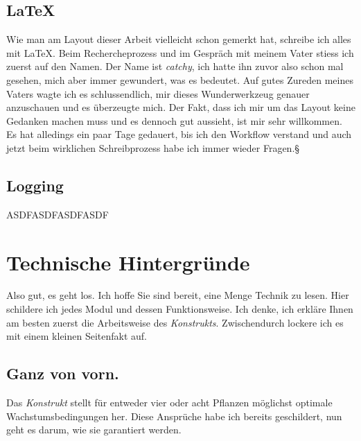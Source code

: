 \documentclass[12pt,titlepage,a4paper]{article}
\begin{document}
\subsection{LaTeX}
Wie man am Layout dieser Arbeit vielleicht schon gemerkt hat, schreibe ich alles mit LaTeX. Beim Rechercheprozess und im Gespräch mit meinem Vater stiess ich zuerst auf den Namen. Der Name ist \textit{catchy}, ich hatte ihn zuvor also schon mal gesehen, mich aber immer gewundert, was es bedeutet. Auf gutes Zureden meines Vaters wagte ich es schlussendlich, mir dieses Wunderwerkzeug genauer anzuschauen und es überzeugte mich. Der Fakt, dass ich mir um das Layout keine Gedanken machen muss und es dennoch gut aussieht, ist mir sehr willkommen. Es hat alledings ein paar Tage gedauert, bis ich den Workflow verstand und auch jetzt beim wirklichen Schreibprozess habe ich immer wieder Fragen.§

\subsection{Logging}
ASDFASDFASDFASDF


\section{Technische Hintergründe}
Also gut, es geht los. Ich hoffe Sie sind bereit, eine Menge Technik zu lesen. Hier schildere ich jedes Modul und dessen Funktionsweise. Ich denke, ich erkläre Ihnen am besten zuerst die Arbeitsweise des \textit{Konstrukts}. Zwischendurch lockere ich es mit einem kleinen Seitenfakt auf.
\subsection{Ganz von vorn.}
Das \textit{Konstrukt }stellt für entweder vier oder acht Pflanzen möglichst optimale Wachstumsbedingungen her. Diese Ansprüche habe ich bereits geschildert, nun geht es darum, wie sie garantiert werden.
\end{document}
